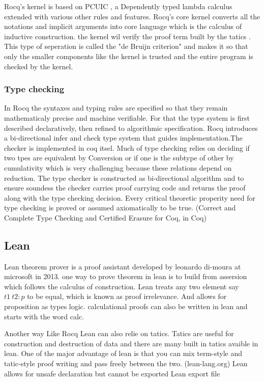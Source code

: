 \documentclass[12pt]{article}
\begin{document}
    Rocq's kernel is based on PCUIC , a Dependently typed lambda calculus extended with various other rules and features. Rocq's core kernel converts all the notations and implicit arguments into core language which is the calculus of inductive construction. 
    the kernel wil verify the proof term built by the tatics . This type of seperation is called the "de Bruijn criterion" and makes it so that only the smaller components
    like the kernel is trusted and the entire program is checked by the kernel.

\subsubsection{Type checking}
        In Rocq the syntaxes and typing rules are specified so that they remain mathematicaly precise and machine verifiable. For that the type system is first described declaratively, then refined to
        algorithmic specification. Rocq introduces a bi-directional infer and check type system that guides implementation.The checker is implemented in coq itsel. Much of type checking relies on deciding if two tpes are equivalent by Conversion or if one is the subtype of 
        other by cumulativity which is very challenging because these relations depend on reduction. The type checker is constructed as bi-directional algorithm and to ensure soundess the checker carries proof carrying code and returns the proof along with 
        the type checking decision. Every critical theoretic properity need for type checking is proved or assumed axiomatically to be true.  (Correct and Complete Type Checking and Certified Erasure for Coq, in Coq)



\subsection{Lean} 
Lean theorem prover is a proof assistant developed by leonardo di-moura at microsoft in 2013. one way to prove theorem in lean is to 
build from assersion which follows the calculus of construction. Lean treats any two element say 
$ t1 \ t2: p $ to be equal, which is known as proof irrelevance. And allows for proposition as types logic. calculational proofs can also be written in lean and starts 
with the word calc. 

Another way Like Rocq Lean can also relie on tatics. Tatics are useful for construction and destruction of data and there are many built in tatics avaible in lean. One of the major advantage of lean 
is that you can mix term-style and tatic-style proof writing and pass freely between the two. (lean-lang.org) Lean allows for unsafe declaration but cannot be exported
Lean export file 
\end{document}
